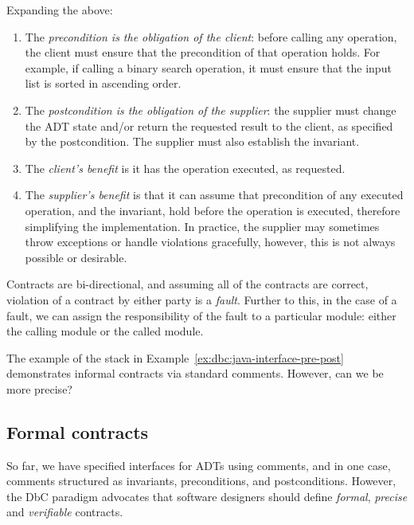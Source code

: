 Expanding the above:

\begin{enumerate}

 \item The \emph{precondition is the obligation of the client}: before calling any operation, the client must ensure that the precondition of that operation holds. For example, if calling a binary search operation, it must ensure that the input list is sorted in ascending order.

 \item The \emph{postcondition is the obligation of the supplier}: the supplier must change the ADT state and/or return the requested result to the client, as specified by the postcondition. The supplier must also establish the invariant.

 \item The \emph{client's benefit} is it has the operation executed, as requested.

 \item The \emph{supplier's benefit} is that it can assume that precondition of any executed operation, and the invariant, hold before the operation is executed, therefore simplifying the implementation. In practice, the supplier may sometimes throw exceptions or handle violations gracefully, however, this is not always possible or desirable.

\end{enumerate}

Contracts are bi-directional, and assuming all of the contracts are correct, violation of a contract by either party is a \emph{fault}.  Further to this, in the case of a fault, we can assign the responsibility of the fault to a particular module: either the calling module or the called module.

The example of the stack in Example~\ref{ex:dbc:java-interface-pre-post} demonstrates informal contracts via standard comments. However, can we be more precise?


\subsection{Formal contracts}

So far, we have specified interfaces for ADTs using comments, and in one case, comments structured as invariants, preconditions, and postconditions. However, the DbC paradigm advocates that software designers should define \emph{formal}, \emph{precise} and \emph{verifiable} contracts. 

